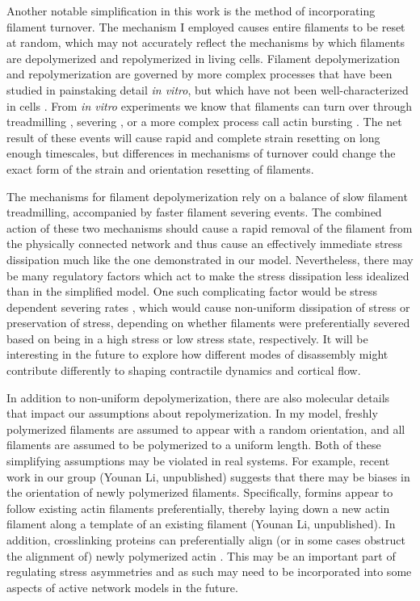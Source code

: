 Another notable simplification in this work is the method of incorporating filament turnover. The mechanism I employed causes entire filaments to be reset at random, which may not accurately reflect  the mechanisms by which filaments are depolymerized and repolymerized in living cells. Filament depolymerization and repolymerization are governed by more complex processes that have been studied in painstaking detail \textit{in vitro}, but which have not been well-characterized in cells \cite{doi:10.1146/annurev-biophys-051309-103849, Robin:2014aa}.  From \textit{in vitro} experiments we know that filaments can turn over through treadmilling \cite{doi:10.1146/annurev-biophys-051309-103849}, severing \cite{bemenet}, or a more complex process call actin bursting \cite{Kueh2008}.  The net result of these events will cause rapid and complete strain resetting on long enough timescales, but differences in mechanisms of turnover could  change the exact form of the strain and orientation resetting of filaments.

The mechanisms for filament depolymerization rely on a balance of slow filament treadmilling, accompanied by faster filament severing events.  The combined action of these two mechanisms should cause a rapid removal of the filament from the physically connected network and thus cause an effectively immediate stress dissipation much like the one demonstrated in our model. Nevertheless, there may be many regulatory factors which act to make the stress dissipation less idealized than in the simplified model.  One such complicating factor would be stress dependent severing rates \cite{Hayakawa721, Murrell:2015aa}, which would cause non-uniform dissipation of stress or preservation of stress, depending on whether filaments were preferentially severed based on being in a high stress or low stress state, respectively. It will be interesting in the future to explore how different modes of disassembly might contribute differently to shaping contractile dynamics and cortical flow.

In addition to non-uniform depolymerization, there are also molecular details that impact our assumptions about repolymerization. In my model, freshly polymerized filaments are assumed to appear with a random orientation, and all filaments are assumed to be polymerized to a uniform length.  Both of these simplifying assumptions may be violated in real systems. For example, recent work in our group (Younan Li, unpublished) suggests that there may be biases in the orientation of newly polymerized filaments.  Specifically, formins appear to follow existing actin filaments preferentially, thereby laying down a new actin filament along a template of an existing filament (Younan Li, unpublished).  In addition, crosslinking proteins can preferentially align (or in some cases obstruct the alignment of) newly polymerized actin \cite{Falzone2012}.  This may be an important part of regulating stress asymmetries and as such may need to be incorporated into some aspects of active network models in the future.  

